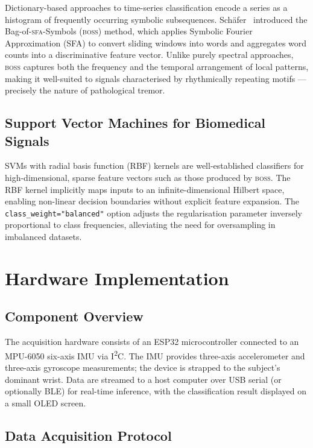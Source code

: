 \documentclass[12pt, a4paper]{article}
\newcommand{\boss}{\textsc{boss}}
\newcommand{\sfa}{\textsc{sfa}}
\begin{document}
Dictionary-based approaches to time-series classification encode
a series as a histogram of frequently occurring symbolic subsequences.
Schäfer~\cite{boss} introduced the Bag-of-\sfa{}-Symbols (\boss{})
method, which applies Symbolic Fourier Approximation (SFA) to convert
sliding windows into words and aggregates word counts into a
discriminative feature vector. Unlike purely spectral approaches,
\boss{} captures both the frequency and the temporal arrangement
of local patterns, making it well-suited to signals characterised
by rhythmically repeating motifs — precisely the nature of
pathological tremor.

\subsection{Support Vector Machines for Biomedical Signals}

SVMs with radial basis function (RBF) kernels are well-established
classifiers for high-dimensional, sparse feature vectors such as those
produced by \boss{}. The RBF kernel implicitly maps inputs to an
infinite-dimensional Hilbert space, enabling non-linear decision
boundaries without explicit feature expansion. The
\texttt{class\_weight="balanced"} option adjusts the regularisation
parameter inversely proportional to class frequencies, alleviating
the need for oversampling in imbalanced datasets.

\section{Hardware Implementation}
\label{sec:hardware}

\subsection{Component Overview}

The acquisition hardware consists of an ESP32 microcontroller
connected to an MPU-6050 six-axis IMU via I\textsuperscript{2}C.
The IMU provides three-axis accelerometer and three-axis gyroscope
measurements; the device is strapped to the subject's dominant wrist.
Data are streamed to a host computer over USB serial (or optionally
BLE) for real-time inference, with the classification result displayed
on a small OLED screen.

\subsection{Data Acquisition Protocol}
\end{document}
